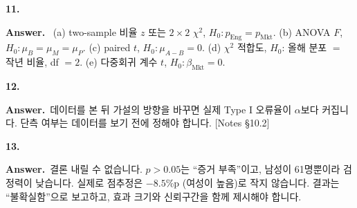 \documentclass[11pt,a4paper]{article}
\newcommand{\nref}[1]{{\footnotesize\textsf{\color{blue!55!black}[Notes #1]}}}
\newcommand{\Ans}{\par\textbf{Answer.}\ }
\begin{document}
\textbf{11.}
\Ans
(a) two-sample 비율 $z$ 또는 $2\times2$ $\chi^2$, $H_0:p_{\text{Eng}}=p_{\text{Mkt}}$.
(b) ANOVA $F$, $H_0:\mu_B=\mu_M=\mu_P$.
(c) paired $t$, $H_0:\mu_{A-B}=0$.
(d) $\chi^2$ 적합도, $H_0$: 올해 분포 $=$ 작년 비율, df $=2$.
(e) 다중회귀 계수 $t$, $H_0:\beta_{\text{Mkt}}=0$.

\textbf{12.}
\Ans 데이터를 본 뒤 가설의 방향을 바꾸면 실제 Type I 오류율이 $\alpha$보다 커집니다. 단측 여부는 데이터를 보기 전에 정해야 합니다. \nref{§10.2}

\textbf{13.}
\Ans 결론 내릴 수 없습니다. $p>0.05$는 ``증거 부족''이고, 남성이 61명뿐이라 검정력이 낮습니다. 실제로 점추정은 $-8.5$\%p (여성이 높음)로 작지 않습니다. 결과는 ``불확실함''으로 보고하고, 효과 크기와 신뢰구간을 함께 제시해야 합니다.
\end{document}
